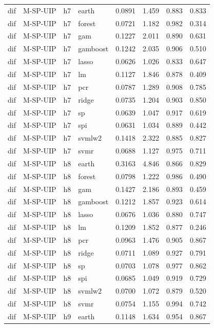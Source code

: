\begin{ThreePartTable}
\begin{longtable}[t]{llclcccc}
\addlinespace
dif & M-SP-UIP & h7 & earth & 0.0891 & 1.459 & 0.883 & 0.833\\
dif & M-SP-UIP & h7 & forest & 0.0721 & 1.182 & 0.982 & 0.314\\
dif & M-SP-UIP & h7 & gam & 0.1227 & 2.011 & 0.890 & 0.631\\
dif & M-SP-UIP & h7 & gamboost & 0.1242 & 2.035 & 0.906 & 0.510\\
dif & M-SP-UIP & h7 & lasso & 0.0626 & 1.026 & 0.833 & 0.647\\
dif & M-SP-UIP & h7 & lm & 0.1127 & 1.846 & 0.878 & 0.409\\
dif & M-SP-UIP & h7 & pcr & 0.0787 & 1.289 & 0.908 & 0.785\\
dif & M-SP-UIP & h7 & ridge & 0.0735 & 1.204 & 0.903 & 0.850\\
dif & M-SP-UIP & h7 & sp & 0.0639 & 1.047 & 0.917 & 0.619\\
dif & M-SP-UIP & h7 & spi & 0.0631 & 1.034 & 0.889 & 0.442\\
dif & M-SP-UIP & h7 & svmlw2 & 0.1418 & 2.322 & 0.885 & 0.827\\
dif & M-SP-UIP & h7 & svmr & 0.0688 & 1.127 & 0.975 & 0.711\\
\addlinespace
dif & M-SP-UIP & h8 & earth & 0.3163 & 4.846 & 0.866 & 0.829\\
dif & M-SP-UIP & h8 & forest & 0.0798 & 1.222 & 0.986 & 0.490\\
dif & M-SP-UIP & h8 & gam & 0.1427 & 2.186 & 0.893 & 0.459\\
dif & M-SP-UIP & h8 & gamboost & 0.1212 & 1.857 & 0.923 & 0.614\\
dif & M-SP-UIP & h8 & lasso & 0.0676 & 1.036 & 0.880 & 0.747\\
dif & M-SP-UIP & h8 & lm & 0.1209 & 1.852 & 0.877 & 0.246\\
dif & M-SP-UIP & h8 & pcr & 0.0963 & 1.476 & 0.905 & 0.867\\
dif & M-SP-UIP & h8 & ridge & 0.0711 & 1.089 & 0.927 & 0.791\\
dif & M-SP-UIP & h8 & sp & 0.0703 & 1.078 & 0.977 & 0.862\\
dif & M-SP-UIP & h8 & spi & 0.0685 & 1.049 & 0.919 & 0.729\\
dif & M-SP-UIP & h8 & svmlw2 & 0.0700 & 1.072 & 0.879 & 0.520\\
dif & M-SP-UIP & h8 & svmr & 0.0754 & 1.155 & 0.994 & 0.742\\
\addlinespace
dif & M-SP-UIP & h9 & earth & 0.1148 & 1.634 & 0.954 & 0.867\\

\end{longtable}
\end{ThreePartTable}
